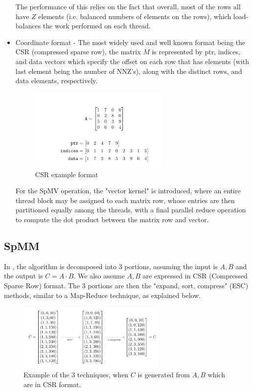 \documentclass[12pt]{article}
\begin{document}
\begin{itemize}
The performance of this relies on the fact that overall, most of the rows all have $Z$ elements (i.e. balanced numbers of elements on the rows), which load-balances the work performed on each thread.


\item Coordinate format - The most widely used and well known format being the CSR (compressed sparse row), the matrix $M$ is represented by ptr, indices, and data vectors which specify the offset on each row that has elements (with last element being the number of NNZ's), along with the distinct rows, and data elements, respectively. 
\begin{figure}[h]
  \caption{CSR example format}
  \centering 
  \includegraphics[width = 0.65\textwidth]{CSR.png}
\end{figure}
For the SpMV operation, the "vector kernel" is introduced, where an entire thread block may be assigned to each matrix row, whose entries are then partitioned equally among the threads, with a final parallel reduce operation to compute the dot product between the matrix row and vector. 
\end{itemize}




\subsection{SpMM}
In \cite{bell_spmm}, the algorithm is decomposed into 3 portions, assuming the input is $A, B$ and the output is $C = A \cdot B$. We also assume  $A,B$ are expressed in CSR (Compressed Sparse Row) format. The 3 portions are then the "expand, sort, compress" (ESC) methods, similar to a Map-Reduce technique, as explained below. 

\begin{figure}[h]
  \caption{Example of the 3 techniques, when $C$ is generated from $A,B$ which are in CSR format. }
  \centering 
  \includegraphics[width = 0.65\textwidth]{expand_sort_compress.png}
\end{figure}
\end{document}
